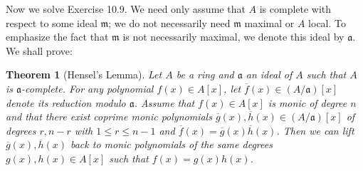 \documentclass[parskip=half,fontsize=12pt]{scrartcl}%
\newcommand{\mf}{\mathfrak}
\newcommand{\aaa}{\mf a}
\newcommand{\mmm}{\mf m}
\newtheorem{thm}{Theorem}%
\begin{document}
Now we solve Exercise 10.9. We need only assume that $A$ is complete with respect to some ideal $\mmm$; we do not necessarily need $\mmm$ maximal or $A$ local. To emphasize the fact that $\mmm$ is not necessarily maximal, we denote this ideal by $\aaa$. We shall prove:

\begin{thm}[Hensel's Lemma]\label{hl}
Let $A$ be a ring and $\aaa$ an ideal of $A$ such that $A$ is $\aaa$-complete. For any polynomial $f(x)\in A[x]$, let $\overline f(x)\in(A/\aaa)[x]$ denote its reduction modulo $\aaa$. Assume that $f(x)\in A[x]$ is monic of degree $n$ and that there exist coprime monic polynomials $\overline g(x),\overline h(x)\in(A/\aaa)[x]$ of degrees $r,n-r$ with $1\le r\le n-1$ and $\overline f(x)=\overline g(x)\overline h(x)$. Then we can lift $\overline g(x),\overline h(x)$ back to monic polynomials of the same degrees $g(x),h(x)\in A[x]$ such that $f(x)=g(x)h(x)$.
\end{thm}
\end{document}
